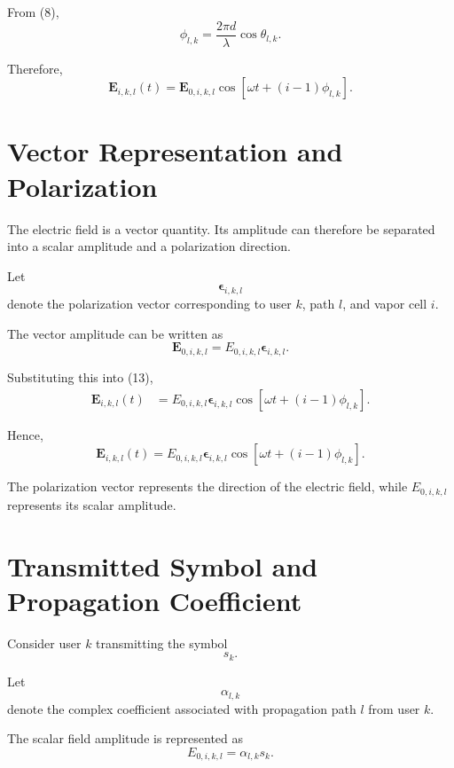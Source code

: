 \documentclass[12pt,a4paper]{article}
\begin{document}
From (8),
\[
\phi_{l,k}
=
\frac{2\pi d}{\lambda}
\cos\theta_{l,k}.
\]

Therefore,
\begin{equation}
\boxed{
\mathbf E_{i,k,l}(t)
=
\mathbf E_{0,i,k,l}
\cos
\left[
\omega t+(i-1)\phi_{l,k}
\right].
}
\tag{13}
\end{equation}

\section{Vector Representation and Polarization}

The electric field is a vector quantity. Its amplitude can therefore
be separated into a scalar amplitude and a polarization direction.

Let
\[
\boldsymbol{\epsilon}_{i,k,l}
\]
denote the polarization vector corresponding to user \(k\),
path \(l\), and vapor cell \(i\).

The vector amplitude can be written as
\[
\mathbf E_{0,i,k,l}
=
E_{0,i,k,l}
\boldsymbol{\epsilon}_{i,k,l}.
\]

Substituting this into (13),
\[
\begin{aligned}
\mathbf E_{i,k,l}(t)
&=
E_{0,i,k,l}
\boldsymbol{\epsilon}_{i,k,l}
\cos
\left[
\omega t+(i-1)\phi_{l,k}
\right].
\end{aligned}
\]

Hence,
\begin{equation}
\boxed{
\mathbf E_{i,k,l}(t)
=
E_{0,i,k,l}
\boldsymbol{\epsilon}_{i,k,l}
\cos
\left[
\omega t+(i-1)\phi_{l,k}
\right].
}
\tag{14}
\end{equation}

The polarization vector represents the direction of the electric
field, while \(E_{0,i,k,l}\) represents its scalar amplitude.



\section{Transmitted Symbol and Propagation Coefficient}

Consider user \(k\) transmitting the symbol
\[
s_k.
\]

Let
\[
\alpha_{l,k}
\]
denote the complex coefficient associated with propagation path
\(l\) from user \(k\).

The scalar field amplitude is represented as
\[
E_{0,i,k,l}
=
\alpha_{l,k}s_k.
\]
\end{document}
